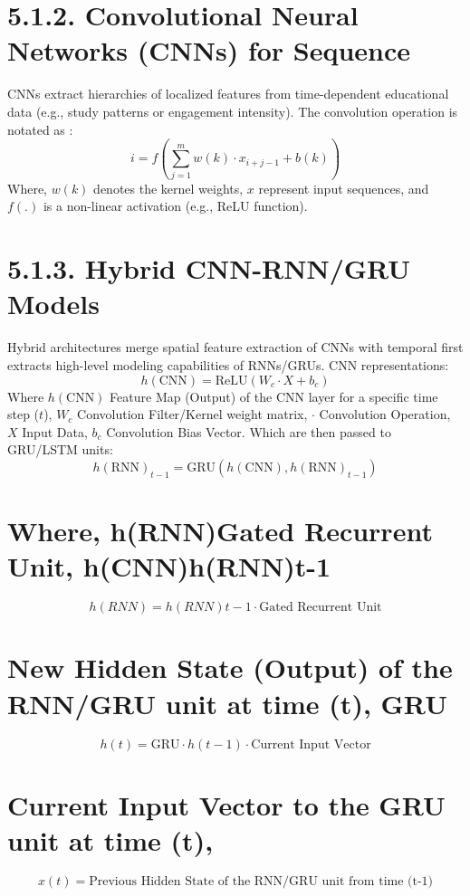 \documentclass[twocolumn]{svjour3}
\begin{document}
\section{5.1.2. Convolutional Neural Networks (CNNs) for Sequence}
CNNs extract hierarchies of localized features from time-dependent educational data (e.g., study patterns or engagement intensity). The convolution operation is notated as \cite{4}:
\begin{equation}
i = f\left(\sum_{j=1}^{m} w(k) \cdot x_{i+j-1} + b(k)\right)
\end{equation}
Where, $w(k)$ denotes the kernel weights, $x$ represent input sequences, and $f(.)$ is a non-linear activation (e.g., ReLU function).
\section{5.1.3. Hybrid CNN-RNN/GRU Models}
Hybrid architectures merge spatial feature extraction of CNNs with temporal first extracts high-level modeling capabilities of RNNs/GRUs. CNN representations:
\begin{equation}
h(\text{CNN}) = \text{ReLU}(W_c \cdot X + b_c)
\end{equation}
Where $h(\text{CNN})$ Feature Map (Output) of the CNN layer for a specific time step ($t$), $W_c$ Convolution Filter/Kernel weight matrix, $\cdot$ Convolution Operation, $X$ Input Data, $b_c$ Convolution Bias Vector.
Which are then passed to GRU/LSTM units:
\begin{equation}
h(\text{RNN})_{t-1} = \text{GRU}(h(\text{CNN}), h(\text{RNN})_{t-1})
\end{equation}

\section{Where, h(RNN)Gated Recurrent Unit, h(CNN)h(RNN)t-1}
\begin{equation}
h(RNN) = h(RNN)t-1 \cdot \text{Gated Recurrent Unit}
\end{equation}
\section{New Hidden State (Output) of the RNN/GRU unit at time (t), GRU}
\begin{equation}
h(t) = \text{GRU} \cdot h(t-1) \cdot \text{Current Input Vector}
\end{equation}
\section{Current Input Vector to the GRU unit at time (t), }
\begin{equation}
x(t) = \text{Previous Hidden State of the RNN/GRU unit from time (t-1)}
\end{equation}
\end{document}
